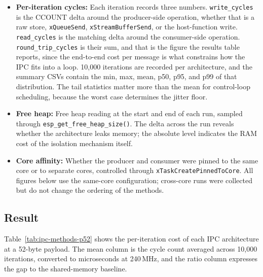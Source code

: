 \documentclass[12pt, a4paper]{report}
\begin{document}
\begin{itemize}
  \item \textbf{Per-iteration cycles:} Each iteration records three numbers. \texttt{write\_cycles} is the CCOUNT delta around the producer-side operation, whether that is a raw store, \texttt{xQueueSend}, \texttt{xStreamBufferSend}, or the host-function write. \texttt{read\_cycles} is the matching delta around the consumer-side operation. \texttt{round\_trip\_cycles} is their sum, and that is the figure the results table reports, since the end-to-end cost per message is what constrains how the IPC fits into a loop. 10{,}000 iterations are recorded per architecture, and the summary CSVs contain the min, max, mean, p50, p95, and p99 of that distribution. The tail statistics matter more than the mean for control-loop scheduling, because the worst case determines the jitter floor.
  \item \textbf{Free heap:} Free heap reading at the start and end of each run, sampled through \texttt{esp\_get\_free\_heap\_size()}. The delta across the run reveals whether the architecture leaks memory; the absolute level indicates the RAM cost of the isolation mechanism itself.
  \item \textbf{Core affinity:} Whether the producer and consumer were pinned to the same core or to separate cores, controlled through \texttt{xTaskCreatePinnedToCore}. All figures below use the same-core configuration; cross-core runs were collected but do not change the ordering of the methods.
\end{itemize}

\subsection{Result}
\label{subsec:containerization-ipc-results}

Table~\ref{tab:ipc-methods-p52} shows the per-iteration cost of each IPC architecture at a 52-byte payload. The mean column is the cycle count averaged across 10{,}000 iterations, converted to microseconds at 240\,MHz, and the ratio column expresses the gap to the shared-memory baseline.
\end{document}
